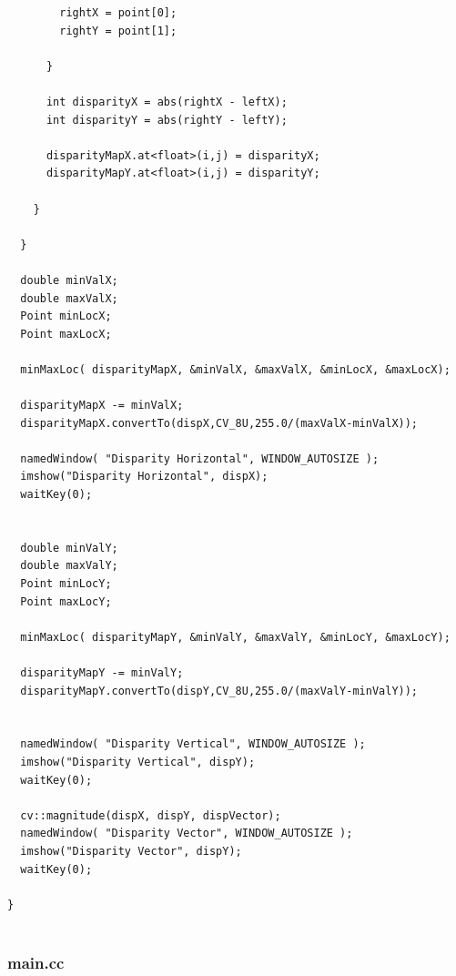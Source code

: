 \documentclass[letterpaper,11pt]{article}
\begin{document}
\begin{verbatim}
      	rightX = point[0];
      	rightY = point[1];

      }

      int disparityX = abs(rightX - leftX);
      int disparityY = abs(rightY - leftY);

      disparityMapX.at<float>(i,j) = disparityX;
      disparityMapY.at<float>(i,j) = disparityY;      
      
    }

  }

  double minValX; 
  double maxValX; 
  Point minLocX; 
  Point maxLocX;

  minMaxLoc( disparityMapX, &minValX, &maxValX, &minLocX, &maxLocX);

  disparityMapX -= minValX;
  disparityMapX.convertTo(dispX,CV_8U,255.0/(maxValX-minValX));

  namedWindow( "Disparity Horizontal", WINDOW_AUTOSIZE );  
  imshow("Disparity Horizontal", dispX);
  waitKey(0);
  

  double minValY; 
  double maxValY; 
  Point minLocY; 
  Point maxLocY;

  minMaxLoc( disparityMapY, &minValY, &maxValY, &minLocY, &maxLocY);

  disparityMapY -= minValY;
  disparityMapY.convertTo(dispY,CV_8U,255.0/(maxValY-minValY));


  namedWindow( "Disparity Vertical", WINDOW_AUTOSIZE );  
  imshow("Disparity Vertical", dispY);
  waitKey(0);

  cv::magnitude(dispX, dispY, dispVector);
  namedWindow( "Disparity Vector", WINDOW_AUTOSIZE );  
  imshow("Disparity Vector", dispY);
  waitKey(0);

}
  
\end{verbatim}

\subsubsection{main.cc}
\end{document}
